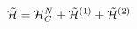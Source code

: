 \begin{equation}
 \tilde{{\cal{H}}}={\cal{H}}_C^N+\tilde{{\cal{H}}}^{(1)}+\tilde{{\cal{H}}}^{(2)}
 \label{a58}
 \end{equation}

